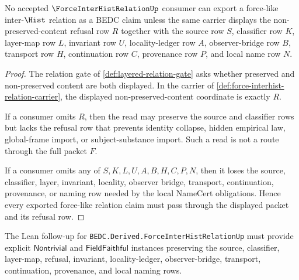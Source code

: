 \begin{theorem}
\label{thm:force-interhist-relation-refusal-nonescape}
No accepted $\ForceInterHistRelationUp$ consumer can export a force-like inter-$\Hist$ relation as a BEDC claim unless the same carrier displays the non-preserved-content refusal row $R$ together with the source row $S$, classifier row $K$, layer-map row $L$, invariant row $U$, locality-ledger row $A$, observer-bridge row $B$, transport row $H$, continuation row $C$, provenance row $P$, and local name row $N$.
\end{theorem}
\begin{proof}
The relation gate of \autoref{def:layered-relation-gate} asks whether preserved and non-preserved content are both displayed. In the carrier of \autoref{def:force-interhist-relation-carrier}, the displayed non-preserved-content coordinate is exactly $R$.

If a consumer omits $R$, then the read may preserve the source and classifier rows but lacks the refusal row that prevents identity collapse, hidden empirical law, global-frame import, or subject-substance import. Such a read is not a route through the full packet $F$.

If a consumer omits any of $S,K,L,U,A,B,H,C,P,N$, then it loses the source, classifier, layer, invariant, locality, observer bridge, transport, continuation, provenance, or naming row needed by the local NameCert obligations. Hence every exported force-like relation claim must pass through the displayed packet and its refusal row.
\end{proof}

The Lean follow-up for \texttt{BEDC.Derived.ForceInterHistRelationUp} must provide explicit $\mathsf{Nontrivial}$ and $\mathsf{FieldFaithful}$ instances preserving the source, classifier, layer-map, refusal, invariant, locality-ledger, observer-bridge, transport, continuation, provenance, and local naming rows.


